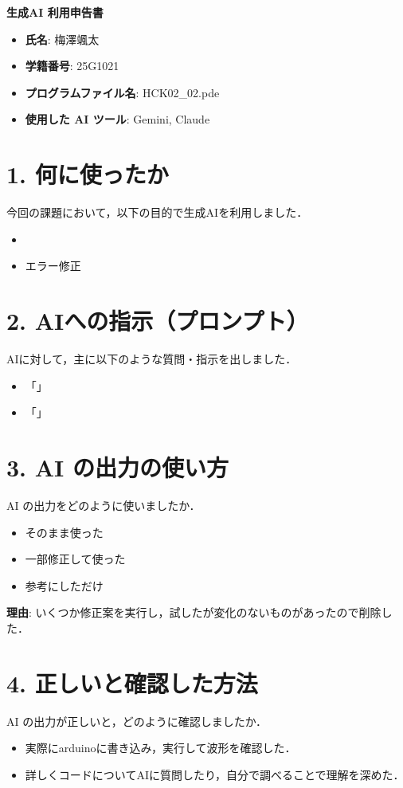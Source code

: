 \documentclass[a4paper,11pt]{jsarticle}
\begin{document}
{\Large \textbf{生成AI 利用申告書}}

\vspace{1em}

\begin{itemize}
    \item \textbf{氏名}: 梅澤颯太
    \item \textbf{学籍番号}: 25G1021
    \item \textbf{プログラムファイル名}: HCK02\_02.pde
    \item \textbf{使用した AI ツール}: Gemini, Claude
\end{itemize}

\section*{1. 何に使ったか}
今回の課題において，以下の目的で生成AIを利用しました．
\begin{itemize}
    \item 
    \item エラー修正
\end{itemize}

\section*{2. AIへの指示（プロンプト）}
AIに対して，主に以下のような質問・指示を出しました．
\begin{itemize}
    \item 「」
    \item 「」
\end{itemize}

\section*{3. AI の出力の使い方}
AI の出力をどのように使いましたか．
\begin{itemize}
    \item[$\square$] そのまま使った
    \item[$\boxtimes$] 一部修正して使った
    \item[$\square$] 参考にしただけ
\end{itemize}
\textbf{理由}:
いくつか修正案を実行し，試したが変化のないものがあったので削除した．

\section*{4. 正しいと確認した方法}
AI の出力が正しいと，どのように確認しましたか．
\begin{itemize}
    \item 実際にarduinoに書き込み，実行して波形を確認した．
    \item 詳しくコードについてAIに質問したり，自分で調べることで理解を深めた．
\end{itemize}
\end{document}
